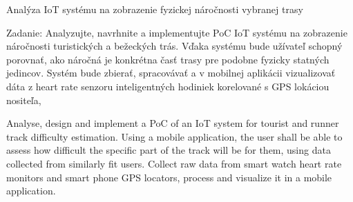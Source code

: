 \linebreak
Analýza IoT systému na zobrazenie fyzickej náročnosti vybranej trasy

Zadanie: Analyzujte, navrhnite a implementujte PoC IoT systému na zobrazenie náročnosti turistických a bežeckých trás. Vďaka systému bude užívateľ schopný porovnať, ako náročná je konkrétna časť trasy pre podobne fyzicky statných jedincov. Systém bude zbierať, spracovávať a v mobilnej aplikácii vizualizovať dáta z heart rate senzoru inteligentných hodiniek korelované s GPS lokáciou nositeľa, 


Analyse, design and implement a PoC of an IoT system for tourist and runner track difficulty estimation.
Using a mobile application, the user shall be able to assess how difficult the specific part of the track will be for them, using data collected from similarly fit users.
Collect raw data from smart watch heart rate monitors and smart phone GPS locators, process and visualize it in a mobile application.